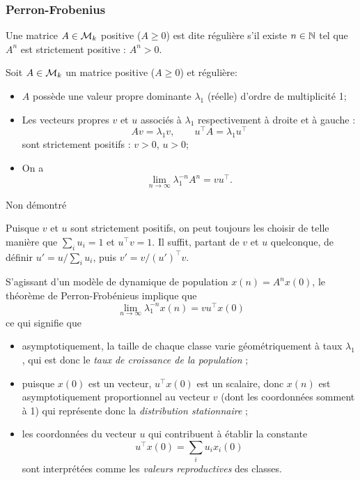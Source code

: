 \subsubsection{Perron-Frobenius}

\begin{definition}
  Une matrice $A \in \mathcal{M}_k$ positive ($A \geq 0$) est dite régulière s'il existe $n \in \mathbb{N}$ tel que $A^n$ est strictement positive : $A^n > 0$.
\end{definition}

\begin{theorem} \label{thm:perronFrobenius}
  Soit $A \in \mathcal{M}_k$ un matrice positive ($A \geq 0$) et régulière:
  \begin{itemize}
    \item $A$ possède une valeur propre dominante $\lambda_1$ (réelle) d'ordre de multiplicité 1;
    \item Les vecteurs propres $v$ et $u$ associés à $\lambda_1$ respectivement à droite et à gauche : 
    $$
    A v = \lambda_1 v, \qquad u^\top A = \lambda_1 u^\top
    $$
    sont strictement positifs : $v > 0$, $u > 0$;
    \item On a 
    $$
    \lim_{n \to \infty} \lambda_1^{-n} A^n = v u^\top.
    $$
  \end{itemize}
\end{theorem}

\proof
Non démontré
\eproof

\remark
Puisque $v$ et $u$ sont strictement positifs, on peut toujours les choisir de telle manière que $\sum_i u_i = 1$ et $u^\top v = 1$. Il suffit, partant de $v$ et $u$ quelconque, de définir $u' = u / \sum_i u_i$, puis $v' = v / (u')^\top v$.

\remark
S'agissant d'un modèle de dynamique de population $x(n) = A^n x(0)$, le théorème de Perron-Frobénieus implique que 
$$
\lim_{n \to \infty} \lambda_1^{-n} x(n) = v u^\top x(0)
$$
ce qui signifie que
\begin{itemize}
 \item asymptotiquement, la taille de chaque classe varie géométriquement à taux $\lambda_1$, qui est donc le {\em taux de croissance de la population} ; 
 \item puisque $x(0)$ est un vecteur, $u^\top x(0)$ est un scalaire, donc $x(n)$ est asymptotiquement proportionnel au vecteur $v$ (dont les coordonnées somment à 1) qui représente donc la {\em distribution stationnaire} ;
 \item les coordonnées du vecteur $u$ qui contribuent à établir la constante 
 $$
 u^\top x(0) = \sum_i u_i x_i(0)
 $$
 sont interprétées comme les {\em valeurs reproductives} des classes.
\end{itemize}

